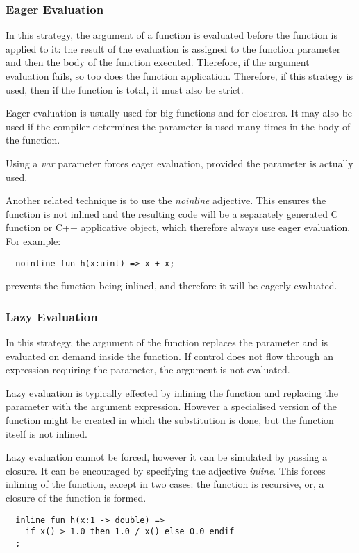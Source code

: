 \documentclass{article}
\begin{document}
\subsubsection{Eager Evaluation}
In this strategy, the argument of a function is evaluated
before the function is applied to it: the result of the evaluation
is assigned to the function parameter and then the body of the
function executed. Therefore, if the argument evaluation fails,
so too does the function application. Therefore, if this 
strategy is used, then if the function is total, it must
also be strict.

Eager evaluation is usually used for big functions
and for closures. It may also be used if the compiler
determines the parameter is used many times in the
body of the function.

Using a {\em var} parameter forces eager evaluation,
provided the parameter is actually used. 

Another related technique is to use the {\em noinline}
adjective. This ensures the function is not inlined
and the resulting code will be a separately generated
C function or C++ applicative object, which therefore
always use eager evaluation. For example:
\begin{verbatim}
  noinline fun h(x:uint) => x + x;
\end{verbatim}
prevents the function being inlined, and therefore
it will be eagerly evaluated.

\subsubsection{Lazy Evaluation}
In this strategy, the argument of the function replaces
the parameter and is evaluated on demand inside the
function. If control does not flow through an expression
requiring the parameter, the argument is not evaluated.

Lazy evaluation is typically effected by inlining the
function and replacing the parameter with the argument
expression. However a specialised version of the function
might be created in which the substitution is done,
but the function itself is not inlined.

Lazy evaluation cannot be forced, however it can be
simulated by passing a closure. It can be encouraged
by specifying the adjective {\em inline}. This forces
inlining of the function, except in two cases:
the function is recursive, or, a closure of the
function is formed.

\begin{verbatim}
  inline fun h(x:1 -> double) => 
    if x() > 1.0 then 1.0 / x() else 0.0 endif
  ;
\end{verbatim}
\end{document}
